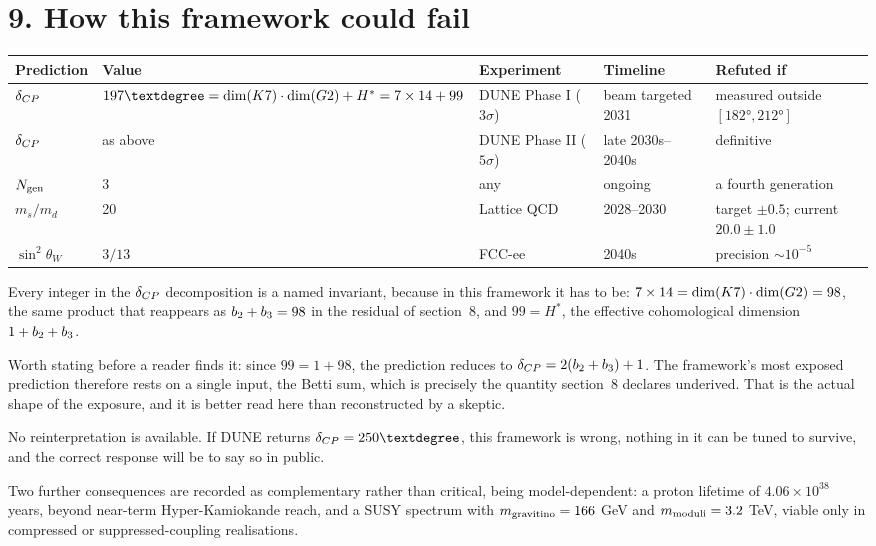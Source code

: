 \documentclass[11pt,a4paper]{article}
\begin{document}
\section{9. How this framework could fail}

\begin{center}
\small
\begin{tabular}{@{}lp{}p{}p{}p{}@{}}
\toprule
\textbf{Prediction} & \textbf{Value} & \textbf{Experiment} & \textbf{Timeline} & \textbf{Refuted if} \\
\midrule
$\delta_{CP}$ & $197° = \dim(\Kseven)\cdot\dim(\Gtwo) + H^* = 7 \times 14 + 99$ & DUNE Phase I ($3\sigma$) & beam targeted 2031 & measured outside $[182°, 212°]$ \\
$\delta_{CP}$ & as above & DUNE Phase II ($5\sigma$) & late 2030s--2040s & definitive \\
$N_{\rm gen}$ & 3 & any & ongoing & a fourth generation \\
$m_s/m_d$ & 20 & Lattice QCD & 2028--2030 & target $\pm 0.5$; current $20.0 \pm 1.0$ \\
$\sin^2\theta_W$ & $3/13$ & FCC-ee & 2040s & precision $\sim 10^{-5}$ \\
\bottomrule
\end{tabular}
\end{center}

Every integer in the $\delta_{CP}$ decomposition is a named invariant,
because in this framework it has to be: $7 \times 14 = \dim(K7) \cdot
\dim(G2) = 98$, the same product that reappears as $b_2 + b_3 =
98$ in the residual of section~8, and $99 = H^*$, the effective
cohomological dimension $1 + b_2 + b_3$.

Worth stating before a reader finds it: since $99 = 1 + 98$, the
prediction reduces to $\delta_{CP} = 2(b_2 + b_3) + 1$. The
framework's most exposed prediction therefore rests on a single input, the
Betti sum, which is precisely the quantity section~8 declares underived.
That is the actual shape of the exposure, and it is better read here than
reconstructed by a skeptic.

No reinterpretation is available. If DUNE returns $\delta_{\CP} = 250°$,
this framework is wrong, nothing in it can be tuned to survive, and the
correct response will be to say so in public.

Two further consequences are recorded as complementary rather than
critical, being model-dependent: a proton lifetime of $4.06 \times
10^{38}$ years, beyond near-term Hyper-Kamiokande reach, and a SUSY
spectrum with $m_{\rm gravitino} = 166$ GeV and $m_{\rm moduli} = 3.2$
TeV, viable only in compressed or suppressed-coupling realisations.
\end{document}
